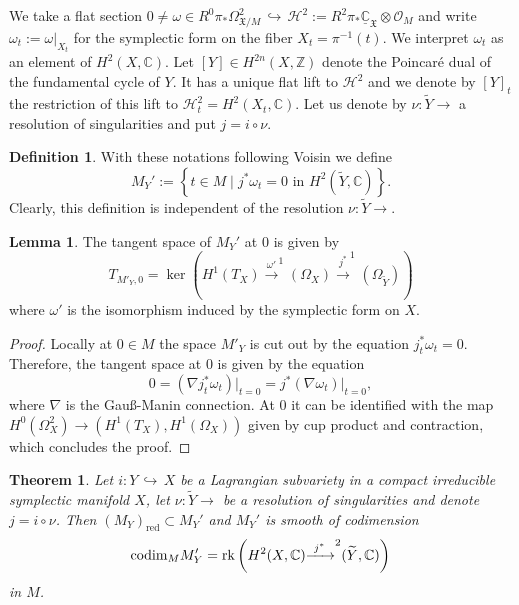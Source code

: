 \documentclass[a4paper,11pt,final]{amsart}
\theoremstyle{plain}
\newtheorem{Thm}[subsection]{Theorem}
\theoremstyle{definition}
\newtheorem{definition}[subsection]{Definition}
\newtheorem{lemma}[subsection]{Lemma}
\numberwithin{equation}{section}
\theoremstyle{remark}
\begin{document}
We take a flat section $0\neq \omega \in R^0\pi_*\Omega^2_{{{\mathfrak X}}/M}{{\, \hookrightarrow\,}} {{\mathscr H}}^2:=R^2\pi_*{{\underline{{{\mathbb C}}}}}_{{\mathfrak X}} {\otimes} {{\mathcal O}}_M$ 
and write $\omega_t:=\omega\vert_{X_t}$ for the symplectic form on the fiber $X_t=\pi^{-1}(t)$. We interpret $\omega_t$ as an element of $H^2(X,{{\mathbb C}})$. Let $[Y]\in H^{2n}(X,{{\mathbb Z}})$ denote the Poincar\'e dual of the fundamental cycle of $Y$. It has a unique flat lift to ${{\mathscr H}}^2$ and we denote by $[Y]_t$ the restriction of this lift to ${{\mathscr H}}^2_t = H^2(X_t,{{\mathbb C}})$. Let us denote by $\nu :{{\widetilde{Y}}} {\xrightarrow{\ \ }}$ a resolution of singularities and put $j=i\circ \nu$.	

\begin{definition}\label{definition subspaces}
With these notations following Voisin \cite{Vo92} we define 
\begin{equation}\label{m2}
M_Y' := \left\{t \in M \mid j^*\omega_t = 0 \textrm{ in } H^2({{\widetilde{Y}}},{{\mathbb C}})\right\}.
\end{equation}
Clearly, this definition is independent of the resolution $\nu:{{\widetilde{Y}}}{\xrightarrow{\ \ }}$.
\end{definition}
\begin{lemma} \label{lemma my' tangent}
The tangent space of $M_Y'$ at $0$ is given by
\begin{equation}\label{tmyprime}
T_{M'_Y,0} = \ker \left(H^1(T_X) {\xrightarrow{\ \omega'\ }}^1(\Omega_X) {\xrightarrow{\ j^* \ }}^1(\Omega_{{\widetilde{Y}}})\right)
\end{equation}
where $\omega'$ is the isomorphism induced by the symplectic form on $X$.
\end{lemma}
\begin{proof}
Locally at $0\in M$ the space $M'_{Y}$ is cut out by the equation $j_t^*\omega_t = 0$. Therefore, the tangent space at $0$ is given by the equation
\[
0=\left(\nabla j_t^*\omega_t\right)\vert_{t=0}=j^*\left(\nabla\omega_t\right)\vert_{t=0},
\]
where $\nabla$ is the Gau\ss-Manin connection. At $0$ it can be identified with the map
$H^0(\Omega_X^2) {\xrightarrow{\ \ }}(H^1(T_X),H^1(\Omega_X))$ 
given by cup product and contraction, which concludes the proof.
\end{proof}
\begin{Thm}\label{thm vormain}
Let $i:Y {{\, \hookrightarrow\,}} X$ be a Lagrangian subvariety in a compact irreducible symplectic manifold 
$X$, let $\nu:{{\widetilde{Y}}}{\xrightarrow{\ \ }}$ be a resolution of singularities and denote $j=i\circ\nu$. Then $(M_Y)_{{\operatorname{red}}} \subset M_Y'$ and $M_Y'$ is smooth of codimension
\begin{equation}\label{codim prime}
{\operatorname{codim}}_M M'_Y = {{\rm rk}}\left(H^2(X,{{\mathbb C}}) {\xrightarrow{\ j^*\ }}^2({{\widetilde{Y}}},{{\mathbb C}})\right)
\end{equation}
in $M$.
\end{Thm}
\end{document}
